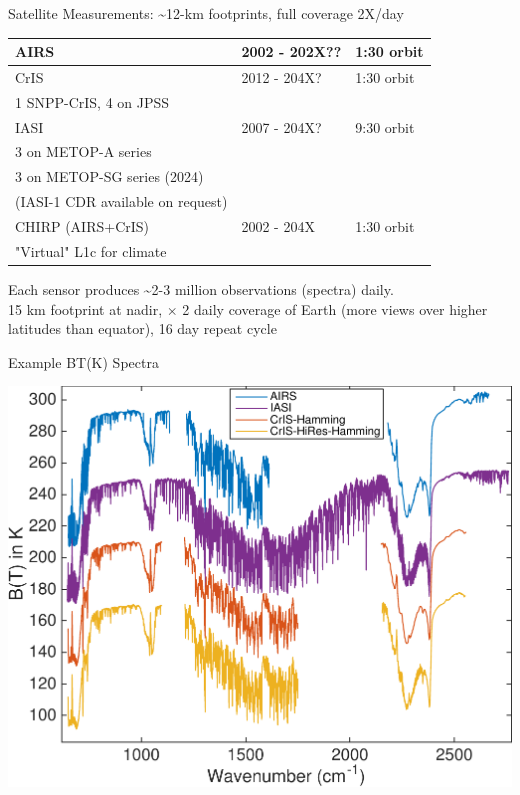 \documentclass[10pt,t]{beamer}
\begin{document}
\begin{frame}{Satellite Measurements: \small \textasciitilde{}12-km footprints, full coverage 2X/day}
\begin{center}
\begin{tabular}{lll}
AIRS & 2002 - 202X?? & 1:30 orbit\\
\hline
CrIS & 2012 - 204X? & 1:30 orbit\\
\small 1 SNPP-CrIS, 4 on JPSS &  & \\
\hline
IASI & 2007 - 204X? & 9:30 orbit\\
\small 3 on METOP-A series &  & \\
\small 3 on METOP-SG series (2024) &  & \\
\small(IASI-1 CDR available on request) &  & \\
\hline
CHIRP (AIRS+CrIS) & 2002 - 204X & 1:30 orbit\\
\small "Virtual" L1c for climate &  & \\
\end{tabular}
\end{center}

Each sensor produces \textasciitilde{}2-3 million observations (spectra) daily. \\
15 km footprint at nadir, $\times$ 2 daily coverage of Earth (more views over higher latitudes than equator), 16 day repeat cycle
\vspace{0.1in}
\end{frame}

\begin{frame}{Example BT(K) Spectra}
\begin{center}
\includegraphics[width=0.9\linewidth]{SunClimate2022/hyperall_hamming.pdf}
\end{center}
\end{frame}
\end{document}
